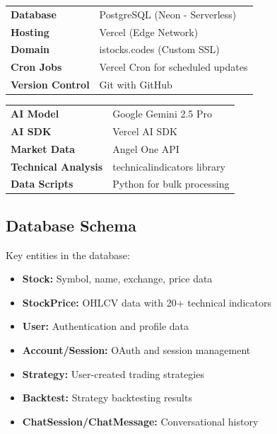 \documentclass[11pt,a4paper]{article}
\begin{document}
\begin{techbox}
\begin{tabularx}{\textwidth}{lX}
    \textbf{Database} & PostgreSQL (Neon - Serverless) \\
    \textbf{Hosting} & Vercel (Edge Network) \\
    \textbf{Domain} & istocks.codes (Custom SSL) \\
    \textbf{Cron Jobs} & Vercel Cron for scheduled updates \\
    \textbf{Version Control} & Git with GitHub \\
\end{tabularx}
\end{techbox}

\begin{techbox}
\begin{tabularx}{\textwidth}{lX}
    \textbf{AI Model} & Google Gemini 2.5 Pro \\
    \textbf{AI SDK} & Vercel AI SDK \\
    \textbf{Market Data} & Angel One API \\
    \textbf{Technical Analysis} & technicalindicators library \\
    \textbf{Data Scripts} & Python for bulk processing \\
\end{tabularx}
\end{techbox}

\subsection{Database Schema}

Key entities in the database:

\begin{itemize}[leftmargin=*]
    \item \textbf{Stock:} Symbol, name, exchange, price data
    \item \textbf{StockPrice:} OHLCV data with 20+ technical indicators
    \item \textbf{User:} Authentication and profile data
    \item \textbf{Account/Session:} OAuth and session management
    \item \textbf{Strategy:} User-created trading strategies
    \item \textbf{Backtest:} Strategy backtesting results
    \item \textbf{ChatSession/ChatMessage:} Conversational history
\end{itemize}
\end{document}

